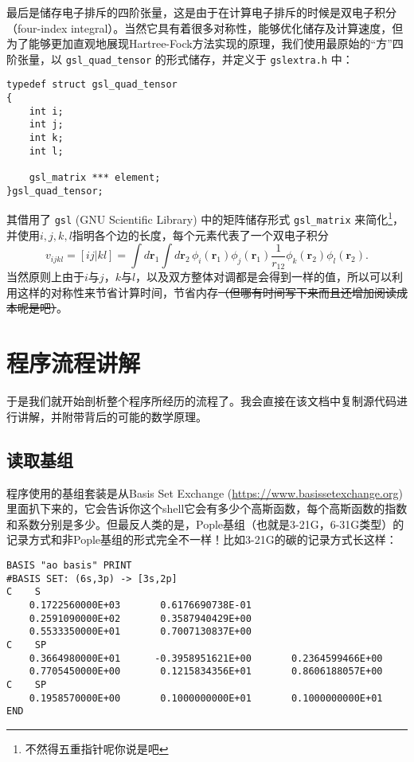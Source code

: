 \documentclass[12pt,a4paper,openany,twoside]{article}
\numberwithin{equation}{section}
\begin{document}
        最后是储存电子排斥的四阶张量，这是由于在计算电子排斥的时候是双电子积分（four-index integral）。当然它具有着很多对称性，能够优化储存及计算速度，但为了能够更加直观地展现Hartree-Fock方法实现的原理，我们使用最原始的``方''四阶张量，以 \lstinline$gsl_quad_tensor$ 的形式储存，并定义于 \lstinline$gslextra.h$ 中：
        \begin{lstlisting}
typedef struct gsl_quad_tensor
{
    int i;
    int j;
    int k;
    int l;

    gsl_matrix *** element;
}gsl_quad_tensor;
        \end{lstlisting}
        其借用了 \lstinline$gsl$ (GNU Scientific Library) 中的矩阵储存形式 \lstinline$gsl_matrix$ 来简化\footnote{不然得五重指针呢你说是吧}，并使用$i,j,k,l$指明各个边的长度，每个元素代表了一个双电子积分
        \begin{equation}
            v_{ijkl} = [ij|kl] = \int d\boldsymbol{r}_1 \int d\boldsymbol{r}_2 \, \phi_i(\boldsymbol{r}_1)\phi_j(\boldsymbol{r}_1) \frac{1}{r_{12}} \phi_k(\boldsymbol{r}_2)\phi_l(\boldsymbol{r}_2).
        \end{equation}
        当然原则上由于$i$与$j$，$k$与$l$，以及双方整体对调都是会得到一样的值，所以可以利用这样的对称性来节省计算时间，节省内存\sout{（但哪有时间写下来而且还增加阅读成本呢是吧）}。

        \section{程序流程讲解}
        于是我们就开始剖析整个程序所经历的流程了。我会直接在该文档中复制源代码进行讲解，并附带背后的可能的数学原理。

            \subsection{读取基组}
            程序使用的基组套装是从Basis Set Exchange (\url{https://www.basissetexchange.org}) 里面扒下来的，它会告诉你这个shell它会有多少个高斯函数，每个高斯函数的指数和系数分别是多少。但最反人类的是，Pople基组（也就是3-21G，6-31G类型）的记录方式和非Pople基组的形式完全不一样！比如3-21G的碳的记录方式长这样：

            \begin{lstlisting}
BASIS "ao basis" PRINT
#BASIS SET: (6s,3p) -> [3s,2p]
C    S
    0.1722560000E+03       0.6176690738E-01
    0.2591090000E+02       0.3587940429E+00
    0.5533350000E+01       0.7007130837E+00
C    SP
    0.3664980000E+01      -0.3958951621E+00       0.2364599466E+00
    0.7705450000E+00       0.1215834356E+01       0.8606188057E+00
C    SP
    0.1958570000E+00       0.1000000000E+01       0.1000000000E+01
END
            \end{lstlisting}
\end{document}
